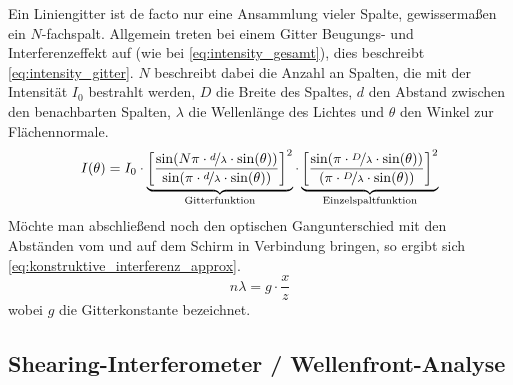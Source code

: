 \documentclass[ngerman]{scrartcl}
\begin{document}
Ein Liniengitter ist de facto nur eine Ansammlung vieler Spalte, gewissermaßen ein $N$-fachspalt. Allgemein treten bei einem Gitter Beugungs- und Interferenzeffekt auf (wie bei \autoref{eq:intensity_gesamt}), dies beschreibt \autoref{eq:intensity_gitter}. $N$ beschreibt dabei die Anzahl an Spalten, die mit der Intensität $I_0$
bestrahlt werden, $D$ die Breite des Spaltes, $d$ den Abstand zwischen den benachbarten Spalten, $\lambda$ die Wellenlänge des Lichtes und $\theta$ den Winkel zur Flächennormale.
\begin{equation}
    \label{eq:intensity_gitter}
    I(\theta) = I_0 \cdot \underbrace{\left[ \frac{\sin(N \pi \cdot \nicefrac{d}{\lambda} \cdot \sin(\theta))}{\sin(\pi \cdot \nicefrac{d}{\lambda} \cdot \sin(\theta))} \right]^2}_{\text{Gitterfunktion}} \cdot \underbrace{\left[ \frac{\sin(\pi \cdot \nicefrac{D}{\lambda} \cdot \sin(\theta))}{(\pi \cdot \nicefrac{D}{\lambda} \cdot \sin(\theta))} \right]^2}_{\text{Einzelspaltfunktion}}
\end{equation}
Möchte man abschließend noch den optischen Gangunterschied mit den Abständen vom und auf dem Schirm in Verbindung bringen, so ergibt sich \autoref{eq:konstruktive_interferenz_approx}.
\begin{equation}
    \label{eq:konstruktive_interferenz_approx_gitter}
    n \lambda = g \cdot \frac{x}{z}
\end{equation}
wobei $g$ die Gitterkonstante bezeichnet.


\subsection{Shearing-Interferometer / Wellenfront-Analyse}
\label{sec:grundlagen_shearing_interferometer}
\end{document}
